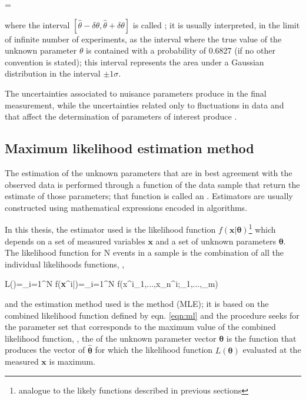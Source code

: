 \beqn
\theta=\hat{\theta}\pm\delta \theta  
\eeqn

\noindent where the interval $[\hat{\theta}-\delta \theta, \hat{\theta}+\delta \theta]$ is called ; it is usually interpreted, in the limit of infinite number of experiments, as the interval where the true value of the unknown parameter $\theta$ is contained with a probability of 0.6827 (if no other convention is stated); this interval represents the area under a Gaussian distribution in the interval $\pm 1\sigma$.    

The uncertainties associated to nuisance parameters produce  in the final measurement, while the uncertainties related only to fluctuations in data and that affect the determination of parameters of interest produce .

\subsection{Maximum likelihood estimation method}

The estimation of the unknown parameters that are in best agreement with the observed data is performed through a function of the data sample that return the estimate of those parameters; that function is called an . Estimators are usually constructed using mathematical expressions encoded in algorithms. 

In this thesis, the estimator used is the likelihood function $f(\textbf{x}|\bm{\theta})$\footnote{analogue to the likely functions described in previous sections} which depends on a set of measured variables $\textbf{x}$ and a set of unknown parameters $\bm{\theta}$. The likelihood function for N events in a sample is the combination of all the individual likelihoods functions, \ie, 

\beqn
L(\bm{\theta})=\prod_{i=1}^N f(\textbf{x}^i|\bm{\theta})=\prod_{i=1}^N f(x^i_1,...,x_n^i;\theta_1,...,\theta_m)\label{eqn:ml}
\eeqn

\noindent and the estimation method used is the  method (MLE); it is based on the combined likelihood function defined by eqn. \ref{eqn:ml} and the procedure seeks for the parameter set that corresponds to the maximum value of the combined likelihood function, \ie, the  of the unknown parameter vector $\bm{\theta}$ is the function that produces the vector of  $\bm{\hat \theta}$ for which the likelihood function $L(\bm{\theta})$ evaluated at the measured $\textbf{x}$ is maximum.  

